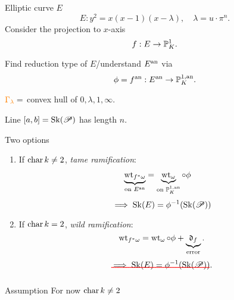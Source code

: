 \begin{frame}
	\begin{minipage}[t]{.7\textwidth}
	Elliptic curve $E$	
	\[
		E: y^2 = x(x-1)(x-\lambda), \quad \lambda = u\cdot \pi^{n}
	.\] 
	Consider the projection to $x$-axis 
	\[
	f: E \to \mathbb P^{1}_K
	.\] 
	\end{minipage}
	\begin{minipage}[t]{.29\textwidth}
	\end{minipage}


	\begin{question}
	Find reduction type of $E$/understand $E{}^{\text{an}}$ via \[
	\phi = f{}^{\text{an}} : E{}^{\text{an}} \to \mathbb P^{1, \text{an}}_K
	.\] 
	\end{question}

\end{frame}
\begin{frame}
	${\color{orange} \Gamma_\lambda} = $ convex hull of $0, \lambda, 1, \infty$.
\begin{figure}[ht]
    \centering
\end{figure}
\end{frame}



\begin{frame}
\begin{figure}[ht]
    \centering
\end{figure}
Line $[a, b] = \operatorname{Sk}(\mathscr P)$ has length  $n$. 
\end{frame}
\begin{frame}{Two options}
	\begin{minipage}[t]{.48\textwidth}
		\begin{enumerate}
		\item If $\operatorname{char} k \ne 2$, \emph{tame ramification}: \begin{align*}
				\underbrace{\operatorname{wt}_{f^*\omega}}_{\text{on }E{}^{\text{an}}} &= \underbrace{\operatorname{wt}_{\omega}}_{\text{on }\mathbb P^{1, \text{an}}_K} \mathbin{\circ} \phi
			\end{align*}
			\pause
			\[
				\implies \operatorname{Sk}(E) = \phi^{-1}(\operatorname{Sk}(\mathscr P))
			\]
	\end{enumerate}
	\pause

	\end{minipage}
	\;
	\begin{minipage}[t]{.48\textwidth}
	\begin{enumerate}
		\setcounter{enumi}{1}
		\item If $\operatorname{char} k = 2$, \emph{wild ramification}:
			\[
				\operatorname{wt}_{f^* \omega} = \operatorname{wt}_{\omega} \circ \phi + \underbrace{\mathfrak{d} _f}_{\text{error}}
			.\] 
			\pause
			\[
				\redout{\text{$\implies \sk(E) = \phi^{-1}(\sk(\sP))$}}
			.\] 
	\end{enumerate}
	\end{minipage}
	\pause
	\medskip
	\begin{block}{Assumption}
		For now $\operatorname{char} k \ne 2$
	\end{block}

\end{frame}

